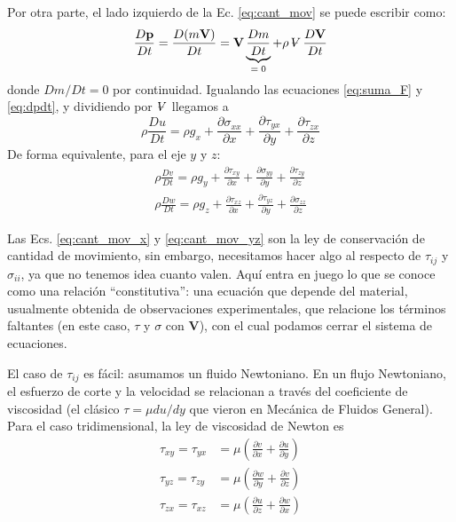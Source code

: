 Por otra parte, el lado izquierdo de la Ec. \eqref{eq:cant_mov} se puede escribir como:
%
\begin{equation}\label{eq:dpdt}
\frac{D\mathbf{p}}{Dt} = \frac{D(m\mathbf{V})}{Dt} = \mathbf{V}\underbrace{\frac{Dm}{Dt}}_\text{$=0$} + \rho\vol\frac{D\mathbf{V}}{Dt}
\end{equation}
%
donde $Dm/Dt=0$ por continuidad.
Igualando las ecuaciones \eqref{eq:suma_F} y \eqref{eq:dpdt}, y dividiendo por $\vol$ llegamos a
%
\begin{equation} \label{eq:cant_mov_x}
\rho\frac{Du}{Dt} = \rho g_x + \frac{\partial \sigma_{xx}}{\partial x} + \frac{\partial \tau_{yx}}{\partial y} + \frac{\partial \tau_{zx}}{\partial z}
\end{equation}
%
De forma equivalente, para el eje $y$ y $z$:
%
\begin{align}\label{eq:cant_mov_yz}
\rho\frac{Dv}{Dt} = \rho g_y + \frac{\partial \tau_{xy}}{\partial x} + \frac{\partial \sigma_{yy}}{\partial y} + \frac{\partial \tau_{zy}}{\partial z}\nonumber \\
\rho\frac{Dw}{Dt} = \rho g_z + \frac{\partial \tau_{xz}}{\partial x} + \frac{\partial \tau_{yz}}{\partial y} + \frac{\partial \sigma_{zz}}{\partial z}
\end{align}

Las Ecs. \eqref{eq:cant_mov_x} y \eqref{eq:cant_mov_yz} son la ley de conservación de cantidad de movimiento, sin embargo, necesitamos hacer algo al respecto de $\tau_{ij}$ y $\sigma_{ii}$, ya que no tenemos idea cuanto valen.
Aquí entra en juego lo que se conoce como una relación ``constitutiva'': una ecuación que depende del material, usualmente obtenida de observaciones experimentales, que relacione los términos faltantes (en este caso, $\tau$ y $\sigma$ con $\mathbf{V}$), con el cual podamos cerrar el sistema de ecuaciones.

El caso de $\tau_{ij}$ es fácil: asumamos un fluido Newtoniano.
En un flujo Newtoniano, el esfuerzo de corte y la velocidad se relacionan a través del coeficiente de viscosidad (el clásico $\tau = \mu du/dy$ que vieron en Mecánica de Fluidos General).
Para el caso tridimensional, la ley de viscosidad de Newton es
%
\begin{align}\label{eq:tau}
\tau_{xy}=\tau_{yx} &= \mu\left(\frac{\partial v}{\partial x}+\frac{\partial u}{\partial y}\right) \nonumber\\
\tau_{yz}=\tau_{zy} &= \mu\left(\frac{\partial w}{\partial y}+\frac{\partial v}{\partial z}\right) \nonumber\\
\tau_{zx}=\tau_{xz} &= \mu\left(\frac{\partial u}{\partial z}+\frac{\partial w}{\partial x}\right)
\end{align}

